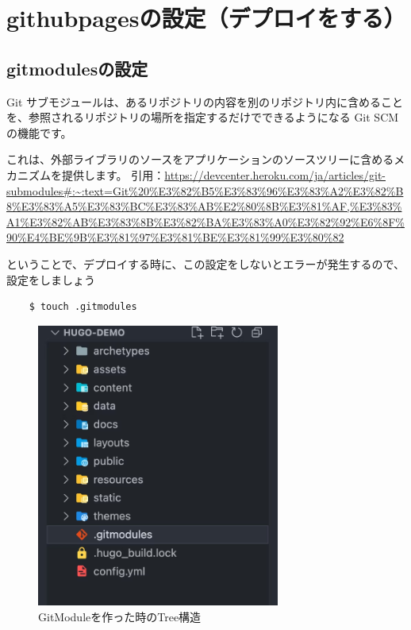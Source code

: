 \chapter{githubpagesの設定（デプロイをする）}
\section{gitmodulesの設定}

  \begin{tcolorbox}[title=gitmodulesとは]
    Git サブモジュールは、あるリポジトリの内容を別のリポジトリ内に含めることを、参照されるリポジトリの場所を指定するだけでできるようになる Git SCMの機能です。 
    
    これは、外部ライブラリのソースをアプリケーションのソースツリーに含めるメカニズムを提供します。
    引用：\url{https://devcenter.heroku.com/ja/articles/git-submodules#:~:text=Git%20%E3%82%B5%E3%83%96%E3%83%A2%E3%82%B8%E3%83%A5%E3%83%BC%E3%83%AB%E2%80%8B%E3%81%AF,%E3%83%A1%E3%82%AB%E3%83%8B%E3%82%BA%E3%83%A0%E3%82%92%E6%8F%90%E4%BE%9B%E3%81%97%E3%81%BE%E3%81%99%E3%80%82}

  \end{tcolorbox}

  ということで、デプロイする時に、この設定をしないとエラーが発生するので、設定をしましょう

  \begin{shaded}
    \begin{verbatim}
    $ touch .gitmodules
    \end{verbatim}
  \end{shaded}

  \begin{figure}[H]
    \centering
    \includegraphics[width=8cm]{./image/02-chap6/make-modules-tree.png}
    \caption{GitModuleを作った時のTree構造}
    \label{chap6-make-modules-tree-image}
  \end{figure}

